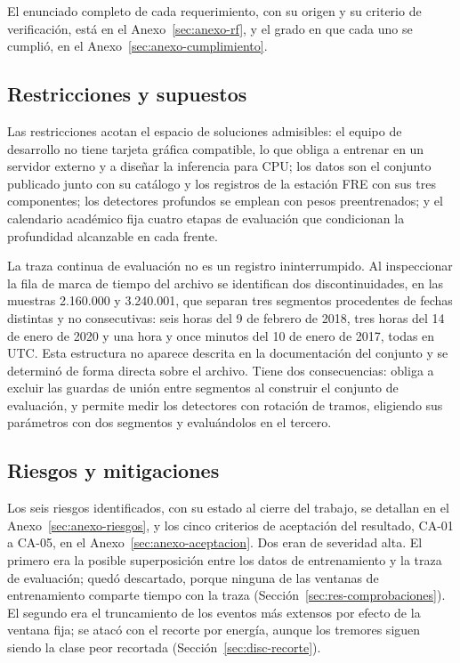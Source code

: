 El enunciado completo de cada requerimiento, con su origen y su criterio de
verificación, está en el Anexo~\ref{sec:anexo-rf}, y el grado en que cada uno
se cumplió, en el Anexo~\ref{sec:anexo-cumplimiento}.

\subsection{Restricciones y supuestos}
\label{sec:restricciones}

Las restricciones acotan el espacio de soluciones admisibles: el equipo de
desarrollo no tiene tarjeta gráfica compatible, lo que obliga a entrenar en un
servidor externo y a diseñar la inferencia para CPU; los datos son el conjunto
publicado junto con su catálogo y los registros de la estación FRE con sus tres
componentes; los detectores profundos se emplean con pesos preentrenados; y el
calendario académico fija cuatro etapas de evaluación que condicionan la
profundidad alcanzable en cada frente.

La traza continua de evaluación no es un registro ininterrumpido. Al inspeccionar
la fila de marca de tiempo del archivo se identifican dos discontinuidades, en las
muestras 2.160.000 y 3.240.001, que separan tres segmentos procedentes de fechas
distintas y no consecutivas: seis horas del 9 de febrero de 2018, tres horas del
14 de enero de 2020 y una hora y once minutos del 10 de enero de 2017, todas en
UTC. Esta estructura no aparece descrita en la documentación del conjunto y se
determinó de forma directa sobre el archivo. Tiene dos consecuencias: obliga a
excluir las guardas de unión entre segmentos al construir el conjunto de
evaluación, y permite medir los detectores con rotación de tramos, eligiendo
sus parámetros con dos segmentos y evaluándolos en el tercero.

\subsection{Riesgos y mitigaciones}
\label{sec:riesgos}

Los seis riesgos identificados, con su estado al cierre del trabajo, se
detallan en el Anexo~\ref{sec:anexo-riesgos}, y los cinco criterios de
aceptación del resultado, CA-01 a CA-05, en el Anexo~\ref{sec:anexo-aceptacion}.
Dos eran de severidad alta. El primero era la posible superposición entre los
datos de entrenamiento y la traza de evaluación; quedó descartado, porque
ninguna de las ventanas de entrenamiento comparte tiempo con la traza
(Sección~\ref{sec:res-comprobaciones}). El segundo era el truncamiento de los
eventos más extensos por efecto de la ventana fija; se atacó con el recorte por
energía, aunque los tremores siguen siendo la clase peor recortada
(Sección~\ref{sec:disc-recorte}).

